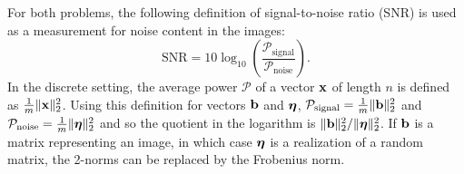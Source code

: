 \documentclass[12pt]{article}
\begin{document}
For both problems, the following definition of signal-to-noise ratio (SNR) is used as a measurement for noise content in the images:
\begin{equation}
\label{eq:SNR}
\text{SNR} = 10\log_{10}\left(\frac{\mathcal{P}_{\text{signal}}}{\mathcal{P}_{\text{noise}}}\right).
\end{equation}
In the discrete setting, the average power $\mathcal{P}$ of a vector $\mathbf{x}$ of length $n$ is defined as $\frac{1}{m}\|\mathbf{x}\|^2_2$. Using this definition for vectors $\mathbf{b}$ and $\bm{\eta}$, $\mathcal{P}_{\text{signal}} = \frac{1}{m}\|\mathbf{b}\|^2_2$ and $\mathcal{P}_{\text{noise}} = \frac{1}{m}\|\bm{\eta}\|^2_2$ and so the quotient in the logarithm is $\|\mathbf{b}\|_2^2/\|\bm{\eta}\|_2^2$. If $\mathbf{b}$ is a matrix representing an image, in which case $\bm{\eta}$ is a realization of a random matrix, the 2-norms can be replaced by the Frobenius norm.
\end{document}
